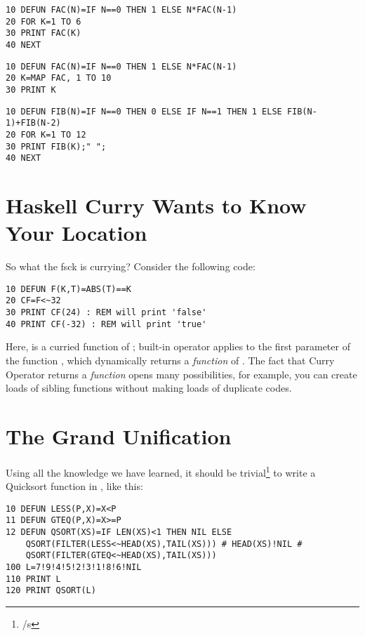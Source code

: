 \begin{lstlisting}
10 DEFUN FAC(N)=IF N==0 THEN 1 ELSE N*FAC(N-1)
20 FOR K=1 TO 6
30 PRINT FAC(K)
40 NEXT
\end{lstlisting}

\begin{lstlisting}
10 DEFUN FAC(N)=IF N==0 THEN 1 ELSE N*FAC(N-1)
20 K=MAP FAC, 1 TO 10
30 PRINT K
\end{lstlisting}


\begin{lstlisting}
10 DEFUN FIB(N)=IF N==0 THEN 0 ELSE IF N==1 THEN 1 ELSE FIB(N-1)+FIB(N-2)
20 FOR K=1 TO 12
30 PRINT FIB(K);" ";
40 NEXT
\end{lstlisting}

\section[Currying]{Haskell Curry Wants to Know Your Location}
\label{currying101}

So what the fsck is currying? Consider the following code:

\begin{lstlisting}
10 DEFUN F(K,T)=ABS(T)==K
20 CF=F<~32
30 PRINT CF(24) : REM will print 'false'
40 PRINT CF(-32) : REM will print 'true'
\end{lstlisting}

Here,  is a curried function of ; built-in operator \code{$<\!\sim$} applies  to the first parameter of the function , which dynamically returns a \emph{function} of . The fact that Curry Operator returns a \emph{function} opens many possibilities, for example, you can create loads of sibling functions without making loads of duplicate codes.

\section[Wrapping-Up]{The Grand Unification}

Using all the knowledge we have learned, it should be trivial\footnote{/s} to write a Quicksort function in \tbas, like this:

\begin{lstlisting}
10 DEFUN LESS(P,X)=X<P
11 DEFUN GTEQ(P,X)=X>=P
12 DEFUN QSORT(XS)=IF LEN(XS)<1 THEN NIL ELSE 
    QSORT(FILTER(LESS<~HEAD(XS),TAIL(XS))) # HEAD(XS)!NIL # 
    QSORT(FILTER(GTEQ<~HEAD(XS),TAIL(XS)))
100 L=7!9!4!5!2!3!1!8!6!NIL
110 PRINT L
120 PRINT QSORT(L)
\end{lstlisting}

